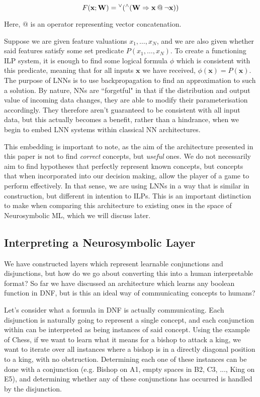 \documentclass[conference]{report}
\begin{document}
$$F(\mathbf{x; W}) = {^\lor}({^\land}(\mathbf{W \Rightarrow x {\mspace{4mu}@\mspace{4mu}} \neg x}))$$

Here, $@$ is an operator representing vector concatenation.

Suppose we are given feature valuations $x_1, \dots, x_N$, and we are also given whether said features satisfy some set predicate $P(x_1, \dots, x_N)$. To create a functioning ILP system, it is enough to find some logical formula $\phi$ which is consistent with this predicate, meaning that for all inputs $\mathbf{x}$ we have received, $\phi(\mathbf{x}) = P(\mathbf{x})$. The purpose of LNNs is to use backpropagation to find an approximation to such a solution. By nature, NNs are ``forgetful" in that if the distribution and output value of incoming data changes, they are able to modify their parameterisation accordingly. They therefore aren't guaranteed to be consistent with all input data, but this actually becomes a benefit, rather than a hindrance, when we begin to embed LNN systems within classical NN architectures. 

This embedding is important to note, as the aim of the architecture presented in this paper is not to find \textit{correct} concepts, but \textit{useful} ones. We do not necessarily aim to find hypotheses that perfectly represent known concepts, but concepts that when incorporated into our decision making, allow the player of a game to perform effectively. In that sense, we are using LNNs in a way that is similar in construction, but different in intention to ILPs. This is an important distinction to make when comparing this architecture to existing ones in the space of Neurosymbolic ML, which we will discuss later.

\subsection{Interpreting a Neurosymbolic Layer}

We have constructed layers which represent learnable conjunctions and disjunctions, but how do we go about converting this into a human interpretable format? So far we have discussed an architecture which learns any boolean function in DNF, but is this an ideal way of communicating concepts to humans?

Let's consider what a formula in DNF is actually communicating. Each disjunction is naturally going to represent a single concept, and each conjunction within can be interpreted as being instances of said concept. Using the example of Chess, if we want to learn what it means for a bishop to attack a king, we want to iterate over all instances where a bishop is in a directly diagonal position to a king, with no obstruction. Determining each one of these instances can be done with a conjunction (e.g. Bishop on A1, empty spaces in B2, C3, ..., King on E5), and determining whether any of these conjunctions has occurred is handled by the disjunction. 
\end{document}
